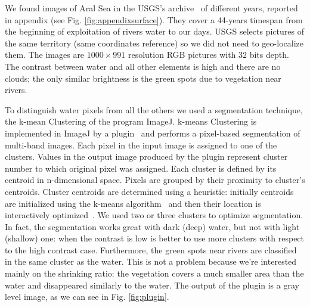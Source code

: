 We found images of Aral Sea in the USGS's archive~\cite{images} of different years, reported in appendix (see Fig. \ref{fig:appendixsurface}).
They cover a 44-years timespan from the beginning of exploitation of rivers water to our days. 
USGS selects pictures of the same territory (same coordinates reference) so we did not need to geo-localize them. 
The images are $1000 \times 991$ resolution RGB pictures with $32$ bits depth. 
The contrast between water and all other elements is high and there are no clouds; the only similar brightness is the green spots due to vegetation near rivers.

To distinguish water pixels from all the others we used a segmentation technique, the k-mean Clustering of the program ImageJ. 
k-means Clustering is implemented in ImageJ by a plugin~\cite{plugin} and performs a pixel-based segmentation of multi-band images. 
Each pixel in the input image is assigned to one of the clusters. 
Values in the output image produced by the plugin represent cluster number to which original pixel was assigned. 
Each cluster is defined by its centroid in n-dimensional space. 
Pixels are grouped by their proximity to cluster's centroids. 
Cluster centroids are determined using a heuristic: initially centroids are initialized using the k-means algorithm~\cite{kmeans} and then their location is interactively optimized~\cite{plugin}.
We used two or three clusters to optimize segmentation. 
In fact, the segmentation works great with dark (deep) water, but not with light (shallow) one: when the contrast is low is better to use more clusters with respect to the high contrast case. 
Furthermore, the green spots near rivers are classified in the same cluster as the water. 
This is not a problem because we're interested mainly on the shrinking ratio: the vegetation covers a much smaller area than the water and disappeared similarly to the water. 
The output of the plugin is a gray level image, as we can see in Fig. \ref{fig:plugin}.
